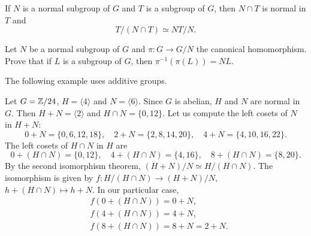 \begin{exercise}
If $N$ is a normal subgroup of $G$ and 
$T$ is a subgroup of $G$, then $N\cap T$ is normal in $T$
and 
\[
T/(N\cap T)\simeq NT/N.
\]
\end{exercise}



\begin{exercise}
Let $N$ be a normal subgroup of $G$ and
$\pi\colon G\to G/N$ the canonical homomorphism. Prove that
if $L$ is a subgroup of $G$, then $\pi^{-1}(\pi(L))=NL$.
\end{exercise}

The following example uses additive groups. 

\begin{example}
\label{exa:Z24}
Let $G=\mathbb{Z}/24$, $H=\langle 4\rangle$ and $N=\langle 6\rangle$. Since $G$ is abelian, $H$ and $N$ are normal in $G$. Then 
$H+N=\langle 2\rangle$ and $H\cap N=\{0,12\}$. Let us compute
the left cosets of $N$ in $H+N$:
\[
0+N=\{0,6,12,18\},
\quad
2+N=\{2,8,14,20\},
\quad
4+N=\{4,10,16,22\}.
\]
The left cosets of $H\cap N$ in $H$ are 
\[
0+(H\cap N)=\{0,12\},
\quad
4+(H\cap N)=\{4,16\},
\quad
8+(H\cap N)=\{8,20\}.
\]
By the second isomorphism theorem, $(H+N)/N\simeq H/(H\cap N)$. The
isomorphism is given by 
$f\colon H/(H\cap N)\to (H+N)/N$, $h+(H\cap N)\mapsto h+N$.
In our particular case, 
\begin{align*}
&f(0+(H\cap N))=0+N,\\
&f(4+(H\cap N))=4+N,\\
&f(8+(H\cap N))=8+N=2+N.
\end{align*}
\end{example}

